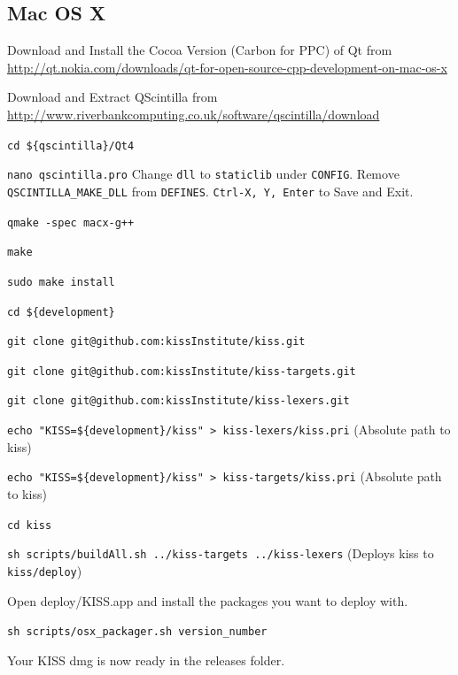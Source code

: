 \documentclass[7pt,letterpaper]{article}
\newcommand{\code}[1]{\texttt{#1}}
\newcounter{counter}
\begin{document}
	\subsection{Mac OS X}
	\begin{list}{Step :~}{}{}
	\item Download and Install the Cocoa Version (Carbon for PPC) of Qt from \newline
	\url{http://qt.nokia.com/downloads/qt-for-open-source-cpp-development-on-mac-os-x}
	\item Download and Extract QScintilla from \newline
	\url{http://www.riverbankcomputing.co.uk/software/qscintilla/download}
	\item \code{cd \$\{qscintilla\}/Qt4}
	\item \code{nano qscintilla.pro} \newline
	Change \code{dll} to \code{staticlib} under \code{CONFIG}. \newline
	Remove \code{QSCINTILLA\_MAKE\_DLL} from \code{DEFINES}. \newline
	\code{Ctrl-X, Y, Enter} to Save and Exit.
	\item \code{qmake -spec macx-g++}
	\item \code{make}
	\item \code{sudo make install}
	\item \code{cd \$\{development\}}
	\item \code{git clone git@github.com:kissInstitute/kiss.git}
	\item \code{git clone git@github.com:kissInstitute/kiss-targets.git}
	\item \code{git clone git@github.com:kissInstitute/kiss-lexers.git}
	\item \code{echo "KISS=\$\{development\}/kiss" > kiss-lexers/kiss.pri} (Absolute path to kiss)
	\item \code{echo "KISS=\$\{development\}/kiss" > kiss-targets/kiss.pri} (Absolute path to kiss)
	\item \code{cd kiss}
	\item \code{sh scripts/buildAll.sh ../kiss-targets ../kiss-lexers} (Deploys kiss to \code{kiss/deploy})
	\item Open deploy/KISS.app and install the packages you want to deploy with.
	\item \code{sh scripts/osx\_packager.sh version\_number}
	\item Your KISS dmg is now ready in the releases folder.
	\end{list}
	
\end{document}

